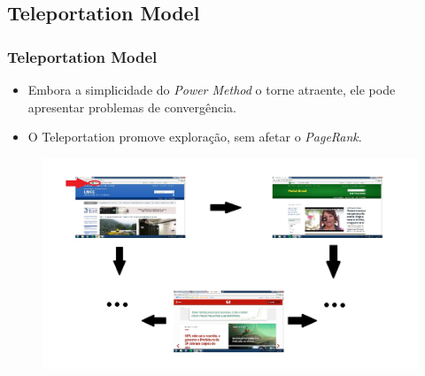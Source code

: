 \documentclass{beamer}
\begin{document}
\begin{frame}
	\subsection{Teleportation Model}
	\frametitle{Teleportation Model}

\begin{itemize}
	\item Embora a simplicidade do \textit{Power Method} o torne atraente, ele pode apresentar problemas de convergência.
	\vspace{0.2cm}	
	\item O Teleportation promove exploração, sem afetar o \textit{PageRank}.
\end{itemize}		
	
\begin{figure}[!htb]
	\centering
	\includegraphics[scale=0.26]{figures/tele}\\
\end{figure}		
	
\end{frame}
\end{document}
